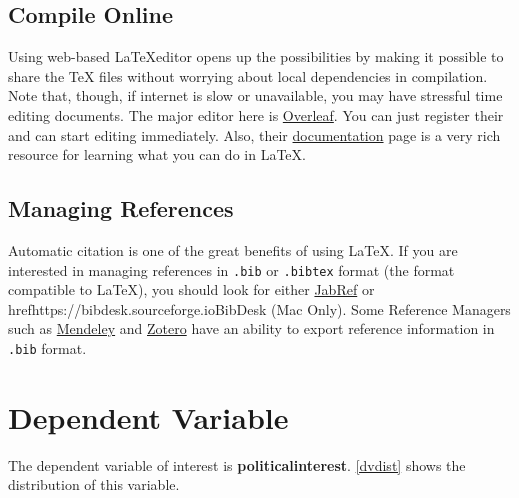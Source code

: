 \documentclass[letterpaper, 12pt]{article}
\begin{document}
    \subsection{Compile Online}

    \par Using web-based \LaTeX editor opens up the possibilities by making it possible to share the TeX files without worrying about local dependencies in compilation. Note that, though, if internet is slow or unavailable, you may have stressful time editing documents. The major editor here is \href{https://www.overleaf.com}{Overleaf}. You can just register their and can start editing immediately. Also, their \href{https://www.overleaf.com/learn/latex/Main_Page}{documentation} page is a very rich resource for learning what you can do in \LaTeX.
    
    \subsection{Managing References}
    
    \par Automatic citation is one of the great benefits of using \LaTeX. If you are interested in managing references in \texttt{.bib} or \texttt{.bibtex} format (the format compatible to \LaTeX), you should look for either \href{http://www.jabref.org}{JabRef} or href{https://bibdesk.sourceforge.io}{BibDesk} (Mac Only). Some Reference Managers such as \href{https://www.mendeley.com/?interaction_required=true}{Mendeley} and \href{https://www.zotero.org}{Zotero} have an ability to export reference information in \texttt{.bib} format.

    \section{Dependent Variable}

    \par The dependent variable of interest is \textbf{politicalinterest}. \autoref{dvdist} shows the distribution of this variable.
\end{document}
